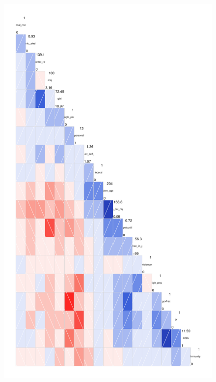\documentclass[a4paper]{article}\usepackage[]{graphicx}\usepackage[]{color}
\begin{document}
\begin{landscape}
\begin{figure}[t]

    \begin{center}

    \includegraphics[scale=0.5]{corrScatter.pdf}

    \end{center}


\end{figure}
\end{landscape}
\end{document}
